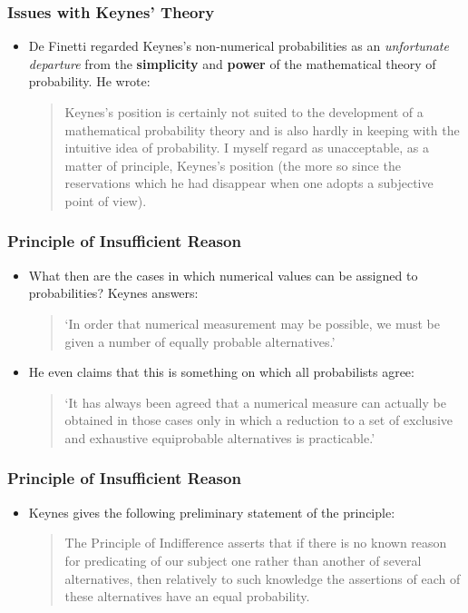 \documentclass[usenames,dvipsnames, 10pt]{beamer}
\begin{document}
\begin{frame}
	\frametitle{Issues with Keynes' Theory}
	
	\begin{itemize}
		\item 	De Finetti regarded Keynes’s non-numerical probabilities as an \emph{unfortunate departure} from
		the \textbf{simplicity} and \textbf{power} of the mathematical theory of probability. He wrote:
		
		\begin{quote}
			Keynes’s position is certainly not suited to the development of a
			mathematical probability theory and is also hardly in keeping with the intuitive
			idea of probability.
			I myself regard as unacceptable, as a matter of principle, Keynes’s
			position (the more so since the reservations which he had disappear when
			one adopts a subjective point of view).
		\end{quote}
	\end{itemize}
\end{frame}

\begin{frame}
	\frametitle{Principle of Insufficient Reason}
	
	\begin{itemize}
		\item 	What then are the cases in which numerical values can be assigned to	probabilities? Keynes answers: 
		
		\begin{quote}
			‘In order that numerical measurement
			may be possible, we must be given a number of equally probable alternatives.’
		\end{quote}
		
		
		\item He even claims that this is something on which all probabilists agree:		
		
		\begin{quote}
			‘It has always been agreed that a numerical measure can actually be obtained in
			those cases only in which a reduction to a set of exclusive and exhaustive
			equiprobable alternatives is practicable.’
		\end{quote}
	\end{itemize}
\end{frame}

\begin{frame}
	\frametitle{Principle of Insufficient Reason}
	
	\begin{itemize}
		\item Keynes gives the following preliminary statement of the principle:
		

		\begin{quote}
			The Principle of Indifference asserts that if there is no known reason for
			predicating of our subject one rather than another of several alternatives,
			then relatively to such knowledge the assertions of each of these alternatives
			have an equal probability.
		\end{quote}		
	\end{itemize}
\end{frame}
\end{document}

